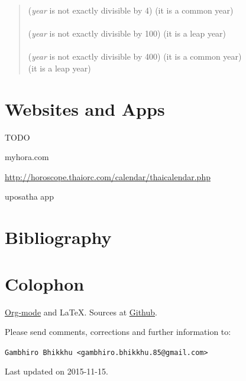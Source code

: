 \documentclass[11pt,oneside]{memoir-article}
\begin{document}
\begin{quote}
 (\emph{year} is not exactly divisible by 4)  (it is a common year)\\
\\
 (\emph{year} is not exactly divisible by 100)  (it is a leap year)\\
\\
 (\emph{year} is not exactly divisible by 400)  (it is a common year)\\
 (it is a leap year)
\autocite{wp-leap-year}
\end{quote}

\backmatter

\chapter{Websites and Apps}
\label{sec-9}

TODO

myhora.com

\url{http://horoscope.thaiorc.com/calendar/thaicalendar.php}

uposatha app

\chapter{Bibliography}
\label{sec-10}
\label{bibliography}

\printbibliography

\chapter{Colophon}
\label{sec-11}

\href{http://orgmode.org/}{Org-mode} and \LaTeX. Sources at \href{https://github.com/profound-labs/calculating-the-uposatha-moondays/}{Github}.

Please send comments, corrections and further information to:

\texttt{Gambhiro Bhikkhu <gambhiro.bhikkhu.85@gmail.com>}

Last updated on 2015-11-15.





\end{document}
